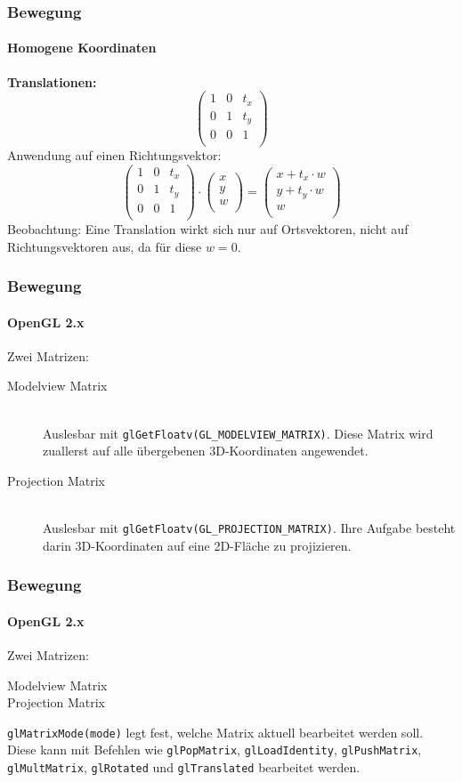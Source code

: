\documentclass[dvips,12pt,xcolor=table]{beamer}
\begin{document}
\begin{frame}
\frametitle{Bewegung}
\framesubtitle{Homogene Koordinaten}
\textbf{Translationen: \\}
\begin{equation}
 \left(\begin{array}{ccc}
  1 & 0 & t_{x} \\
  0 & 1 & t_{y} \\
  0 & 0 & 1 \\
 \end{array}\right)
\end{equation}
Anwendung auf einen Richtungsvektor:
\begin{equation}
 \left(\begin{array}{ccc}
  1 & 0 & t_{x} \\
  0 & 1 & t_{y} \\
  0 & 0 & 1 \\
 \end{array}\right)
 \cdot
 \left(\begin{array}{ccc}
  x \\
  y \\
  w \\
 \end{array}\right)
 =
 \left(\begin{array}{ccc}
  x + t_{x} \cdot w \\
  y + t_{y} \cdot w \\
  w \\
 \end{array}\right)
\end{equation}
Beobachtung:
Eine Translation wirkt sich nur auf Ortsvektoren,
nicht auf Richtungsvektoren aus,
da für diese $w = 0$.
\end{frame}


\begin{frame}
\frametitle{Bewegung}
\framesubtitle{OpenGL 2.x}
Zwei Matrizen:
\begin{description}
 \item[Modelview Matrix] \hfill \\
  Auslesbar mit
  \texttt{glGetFloatv(GL\_MODELVIEW\_MATRIX)}.
  Diese Matrix wird zuallerst
  auf alle übergebenen 3D-Koordinaten angewendet.
 \item[Projection Matrix] \hfill \\
  Auslesbar mit
  \texttt{glGetFloatv(GL\_PROJECTION\_MATRIX)}.
  Ihre Aufgabe besteht darin 3D-Koordinaten
  auf eine 2D-Fläche zu projizieren.
\end{description}
\end{frame}

\begin{frame}
\frametitle{Bewegung}
\framesubtitle{OpenGL 2.x}
Zwei Matrizen:
\begin{description}
 \item[Modelview Matrix]
 \item[Projection Matrix]
\end{description}
\texttt{glMatrixMode(mode)} legt fest,
welche Matrix aktuell bearbeitet werden soll.
Diese kann mit Befehlen wie
\texttt{glPopMatrix},
\texttt{glLoadIdentity},
\texttt{glPushMatrix},
\texttt{glMultMatrix},
\texttt{glRotated} und
\texttt{glTranslated}
bearbeitet werden.
\end{frame}
\end{document}
